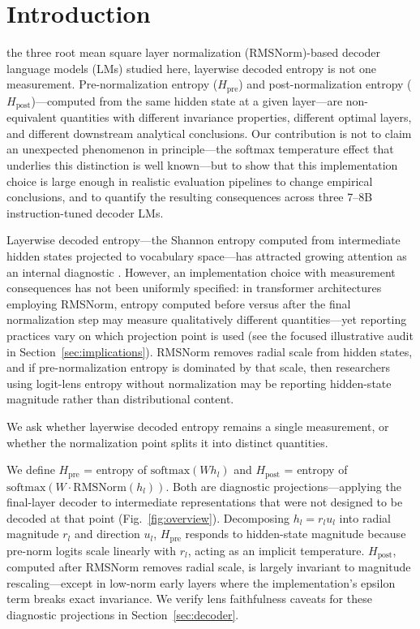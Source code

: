 \documentclass{ieeeaccess}
\newcommand{\Hpre}{H_{\text{pre}}}
\newcommand{\Hpost}{H_{\text{post}}}
\begin{document}
\section{Introduction}
\label{sec:introduction}

 the three root mean square layer normalization (RMSNorm)-based decoder language models (LMs) studied here, layerwise decoded entropy is not one measurement. Pre-normalization entropy ($\Hpre$) and post-normalization entropy ($\Hpost$)---computed from the same hidden state at a given layer---are non-equivalent quantities with different invariance properties, different optimal layers, and different downstream analytical conclusions. Our contribution is not to claim an unexpected phenomenon in principle---the softmax temperature effect that underlies this distinction is well known---but to show that this implementation choice is large enough in realistic evaluation pipelines to change empirical conclusions, and to quantify the resulting consequences across three 7--8B instruction-tuned decoder LMs.

Layerwise decoded entropy---the Shannon entropy computed from intermediate hidden states projected to vocabulary space---has attracted growing attention as an internal diagnostic \cite{ali2025entropylens, ghandeharioun2024patchscopes, kossen2024seps}. However, an implementation choice with measurement consequences has not been uniformly specified: in transformer architectures employing RMSNorm, entropy computed before versus after the final normalization step may measure qualitatively different quantities---yet reporting practices vary on which projection point is used (see the focused illustrative audit in Section~\ref{sec:implications}). RMSNorm removes radial scale from hidden states, and if pre-normalization entropy is dominated by that scale, then researchers using logit-lens entropy without normalization may be reporting hidden-state magnitude rather than distributional content.

We ask whether layerwise decoded entropy remains a single measurement, or whether the normalization point splits it into distinct quantities.

We define $\Hpre$ = entropy of $\text{softmax}(W h_l)$ and $\Hpost$ = entropy of $\text{softmax}(W \cdot \text{RMSNorm}(h_l))$. Both are diagnostic projections---applying the final-layer decoder to intermediate representations that were not designed to be decoded at that point (Fig.~\ref{fig:overview}). Decomposing $h_l = r_l u_l$ into radial magnitude $r_l$ and direction $u_l$, $\Hpre$ responds to hidden-state magnitude because pre-norm logits scale linearly with $r_l$, acting as an implicit temperature. $\Hpost$, computed after RMSNorm removes radial scale, is largely invariant to magnitude rescaling---except in low-norm early layers where the implementation's epsilon term breaks exact invariance. We verify lens faithfulness caveats for these diagnostic projections in Section~\ref{sec:decoder}.
\end{document}
